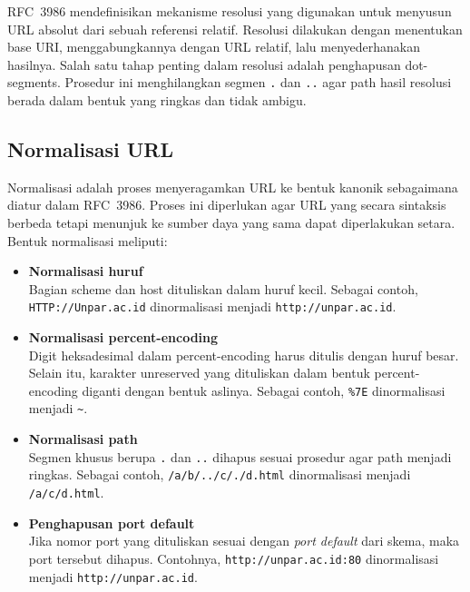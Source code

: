 RFC~3986 mendefinisikan mekanisme resolusi yang digunakan untuk menyusun URL absolut dari sebuah referensi relatif. Resolusi dilakukan dengan menentukan base URI, menggabungkannya dengan URL relatif, lalu menyederhanakan hasilnya. Salah satu tahap penting dalam resolusi adalah penghapusan dot-segments. Prosedur ini menghilangkan segmen \texttt{.} dan \texttt{..} agar path hasil resolusi berada dalam bentuk yang ringkas dan tidak ambigu.

\subsection{Normalisasi URL}
\label{subsec:0202-normalisasi-url}

Normalisasi adalah proses menyeragamkan URL ke bentuk kanonik sebagaimana diatur dalam RFC~3986. Proses ini diperlukan agar URL yang secara sintaksis berbeda tetapi menunjuk ke sumber daya yang sama dapat diperlakukan setara. Bentuk normalisasi meliputi:
\begin{itemize}
  \item \textbf{Normalisasi huruf}\\
  Bagian scheme dan host dituliskan dalam huruf kecil. Sebagai contoh, \texttt{HTTP://Unpar.ac.id} dinormalisasi menjadi \texttt{http://unpar.ac.id}.
  
  \item \textbf{Normalisasi percent-encoding}\\
  Digit heksadesimal dalam percent-encoding harus ditulis dengan huruf besar. Selain itu, karakter unreserved yang dituliskan dalam bentuk percent-encoding diganti dengan bentuk aslinya. Sebagai contoh, \texttt{\%7E} dinormalisasi menjadi \texttt{\~{}}.
  
  \item \textbf{Normalisasi path}\\
  Segmen khusus berupa \texttt{.} dan \texttt{..} dihapus sesuai prosedur agar path menjadi ringkas. Sebagai contoh, \texttt{/a/b/../c/./d.html} dinormalisasi menjadi \texttt{/a/c/d.html}.
  
  \item \textbf{Penghapusan port default}\\
  Jika nomor port yang dituliskan sesuai dengan \textit{port default} dari skema, maka port tersebut dihapus. Contohnya, \texttt{http://unpar.ac.id:80} dinormalisasi menjadi \texttt{http://unpar.ac.id}.
\end{itemize}